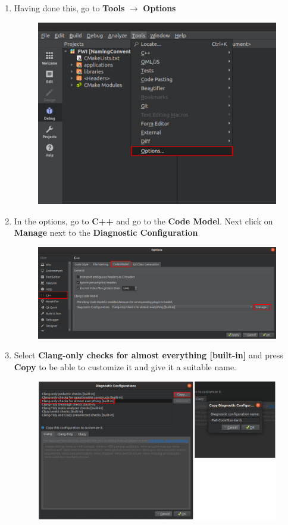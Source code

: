 \documentclass[10pt]{article}
\begin{document}
\begin{enumerate}
\item Having done this, go to \textbf{Tools} $\rightarrow$ \textbf{Options}
\begin{figure}[h!]
\centering
\includegraphics[width=0.6 \textwidth]{clang-tidy3.png}
\end{figure}

\item In the options, go to \textbf{C++} and go to the \textbf{Code Model}. Next click on \textbf{Manage} next to the
\textbf{Diagnostic Configuration}
\begin{figure}[h!]
\centering
\includegraphics[width=0.85 \textwidth]{clang-tidy4.png}
\end{figure}

\item Select \textbf{Clang-only checks for almost everything [built-in]} and press \textbf{Copy} to be able to customize it
and give it a suitable name.
\begin{figure}[h!]
\centering
\includegraphics[width=0.7 \textwidth]{clang-tidy5.png}
\end{figure}


\end{enumerate}
\end{document}
